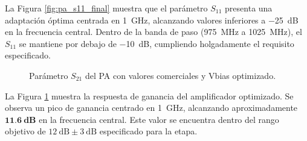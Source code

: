 La Figura \ref{fig:pa_s11_final} muestra que el parámetro $S_{11}$ presenta una adaptación óptima centrada en \qty{1}{\GHz}, alcanzando valores inferiores a \qty{-25}{\dB} en la frecuencia central. Dentro de la banda de paso (\qty{975}{\MHz} a \qty{1025}{\MHz}), el $S_{11}$ se mantiene por debajo de \qty{-10}{\dB}, cumpliendo holgadamente el requisito especificado.

\begin{figure}[htbp]
\centering
{}
\captionsetup{justification=centering}
\caption{Parámetro $S_{21}$ del PA con valores comerciales y Vbias optimizado.}
\label{fig:pa_s21_final}
\end{figure}

La Figura \ref{fig:pa_s21_final} muestra la respuesta de ganancia del amplificador optimizado. Se observa un pico de ganancia centrado en \qty{1}{\GHz}, alcanzando aproximadamente $\mathbf{\qty{11,6}{\dB}}$ en la frecuencia central. Este valor se encuentra dentro del rango objetivo de $\qty{12}{\dB}\pm\qty{3}{\dB}$ especificado para la etapa.

